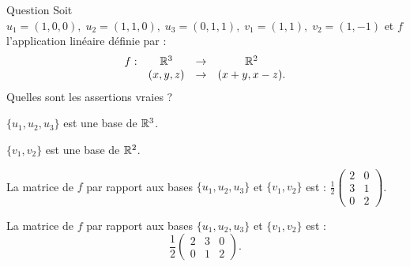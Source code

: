 \begin{multi}[multiple,feedback=
{On vérifie que \(\{ u_1, u_2, u_3\}\) est une base de \(\Rr^3\) et que \(\{ v_1, v_2\}\) est une base de \(\Rr^2\). La matrice de \(f\)  par rapport à ces  bases    est la matrice  dont la \(j\)ième colonne est constituée des coordonnées de  \(f(u_j)\) dans la base \(\{ v_1, v_2\}\). Cette matrice est : \(\displaystyle \frac{1}{2} \left(\begin{array}{rcc} 2&3&0\\ 0&1&2\end{array}\right)\).
}]{Question}
Soit \(u_1=(1,0,0), \;  u_2=(1,1,0), \;  u_3=(0,1,1), \; v_1=(1,1), \; v_2=(1,-1)\)  et \(f\) l'application linéaire définie par :
\[\begin{array}{rccc}f:&\mathbb{R}^3 &\to& \mathbb{R}^2\\
& (x,y,z)&\to &(x+y,x-z).  \end{array}\]
Quelles sont les assertions vraies ?

    \item* \(\{ u_1, u_2, u_3\}\) est une base de \(\Rr^3\).
    \item* \(\{ v_1, v_2\}\) est une base de \(\Rr^2\).
    \item La matrice de \(f\) par rapport aux bases  \(\{ u_1, u_2, u_3\}\) et \(\{ v_1, v_2\}\) est :
\(\displaystyle \frac{1}{2}\left(\begin{array}{rc}
2&0\\ 3&1\\ 0&2\end{array}\right)\).
    \item* La matrice de \(f\) par rapport aux bases  \(\{ u_1, u_2, u_3\}\) et \(\{ v_1, v_2\}\) est :
\[\displaystyle
\frac{1}{2} \left(\begin{array}{rcc}
2&3&0\\ 0&1&2\end{array}\right).\]
\end{multi}


